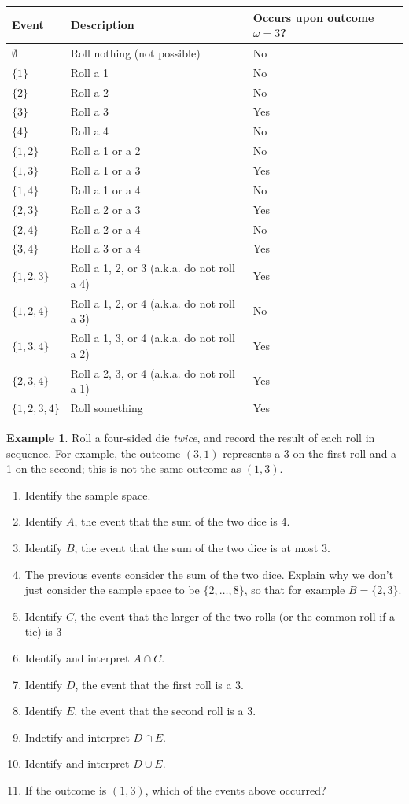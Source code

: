 \documentclass[
]{book}
\providecommand{\tightlist}{%
  \setlength{\itemsep}{0pt}\setlength{\parskip}{0pt}}
\theoremstyle{definition}
\theoremstyle{definition}
\newtheorem{example}{Example}[chapter]
\theoremstyle{definition}
\theoremstyle{remark}
\begin{document}
\begin{longtable}[]{@{}lll@{}}
\toprule
Event & Description & Occurs upon outcome \(\omega=3\)?\tabularnewline
\midrule
\endhead
\(\emptyset\) & Roll nothing (not possible) & No\tabularnewline
\(\{1\}\) & Roll a 1 & No\tabularnewline
\(\{2\}\) & Roll a 2 & No\tabularnewline
\(\{3\}\) & Roll a 3 & Yes\tabularnewline
\(\{4\}\) & Roll a 4 & No\tabularnewline
\(\{1, 2\}\) & Roll a 1 or a 2 & No\tabularnewline
\(\{1, 3\}\) & Roll a 1 or a 3 & Yes\tabularnewline
\(\{1, 4\}\) & Roll a 1 or a 4 & No\tabularnewline
\(\{2, 3\}\) & Roll a 2 or a 3 & Yes\tabularnewline
\(\{2, 4\}\) & Roll a 2 or a 4 & No\tabularnewline
\(\{3, 4\}\) & Roll a 3 or a 4 & Yes\tabularnewline
\(\{1, 2, 3\}\) & Roll a 1, 2, or 3 (a.k.a. do not roll a 4) & Yes\tabularnewline
\(\{1, 2, 4\}\) & Roll a 1, 2, or 4 (a.k.a. do not roll a 3) & No\tabularnewline
\(\{1, 3, 4\}\) & Roll a 1, 3, or 4 (a.k.a. do not roll a 2) & Yes\tabularnewline
\(\{2, 3, 4\}\) & Roll a 2, 3, or 4 (a.k.a. do not roll a 1) & Yes\tabularnewline
\(\{1, 2, 3, 4\}\) & Roll something & Yes\tabularnewline
\bottomrule
\end{longtable}

\begin{example}
\protect\hypertarget{exm:dice-event}{}{\label{exm:dice-event} }Roll a four-sided die \emph{twice}, and record the result of each roll in sequence. For example, the outcome \((3, 1)\) represents a 3 on the first roll and a 1 on the second; this is not the same outcome as \((1, 3)\).
\end{example}

\begin{enumerate}
\def\labelenumi{\arabic{enumi}.}
\tightlist
\item
  Identify the sample space.
\item
  Identify \(A\), the event that the sum of the two dice is 4.
\item
  Identify \(B\), the event that the sum of the two dice is at most 3.
\item
  The previous events consider the sum of the two dice. Explain why we don't just consider the sample space to be \(\{2, \ldots, 8\}\), so that for example \(B = \{2, 3\}\).
\item
  Identify \(C\), the event that the larger of the two rolls (or the common roll if a tie) is 3
\item
  Identify and interpret \(A\cap C\).
\item
  Identify \(D\), the event that the first roll is a 3.
\item
  Identify \(E\), the event that the second roll is a 3.
\item
  Indetify and interpret \(D \cap E\).
\item
  Identify and interpret \(D \cup E\).
\item
  If the outcome is \((1, 3)\), which of the events above occurred?
\end{enumerate}
\end{document}

